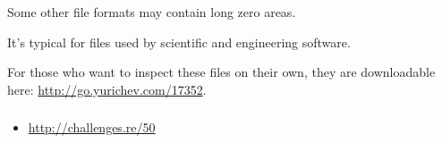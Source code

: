 Some other file formats may contain long zero areas.

It's typical for files used by scientific and engineering software.

For those who want to inspect these files on their own, they are downloadable here: \url{http://go.yurichev.com/17352}.

\subsubsection{\Exercise}

\begin{itemize}
	\item \url{http://challenges.re/50}
\end{itemize}

